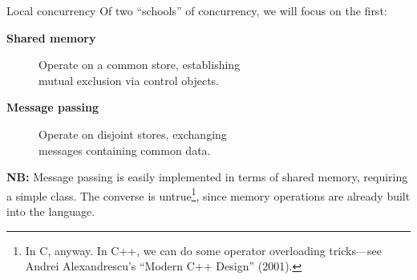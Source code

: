 \documentclass[xcolor={dvipsnames,table}]{beamer}
\begin{document}
\begin{frame}{Local concurrency}
Of two ``schools'' of concurrency, we will focus on the first:
\vfill
\begin{description}
\item[\textbf{Shared memory}]\hfill{Operate on a common store, establishing\\ \hfill mutual exclusion via control objects.}
\item[\textbf{Message passing}]\hfill{Operate on disjoint stores, exchanging\\ \hfill messages containing common data.}
\end{description}
\vfill
\textbf{NB:} Message passing is easily implemented
in terms of shared memory, requiring a simple class. The converse is untrue\footnote{In C, anyway.
In C++, we can do some operator overloading tricks---see Andrei Alexandrescu's ``Modern C++ Design'' (2001).}, since
memory operations are already built into the language.
\end{frame}
\end{document}
